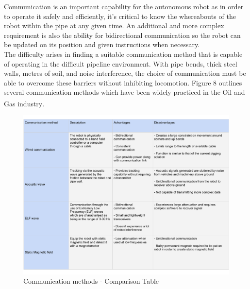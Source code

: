 \documentclass[11pt]{article}		%
\begin{document}
		Communication is an important capability for the autonomous robot as in order to operate it safely and efficiently, it's critical to know the whereabouts of the robot within the pipe at any given time. An additional and more complex requirement is also the ability for bidirectional communication so the robot can be updated on its position and given instructions when necessary. \\
	    The difficulty arises in finding a suitable communication method that is capable of operating in the difficult pipeline environment. With pipe bends, thick steel walls, metres of soil, and noise interference, the choice of communication must be able to overcome these barriers without inhibiting locomotion. Figure 8 outlines several communication methods which have been widely practiced in the Oil and Gas industry\textsuperscript{\cite{acoustic2020}}.
	    \\
        \begin{figure}[h]
			\centering
			\includegraphics[scale=0.6]{commstable.pdf}
			\caption{Communication methods - Comparison Table}
			\label{comparison comms}
		\end{figure}
\end{document}
